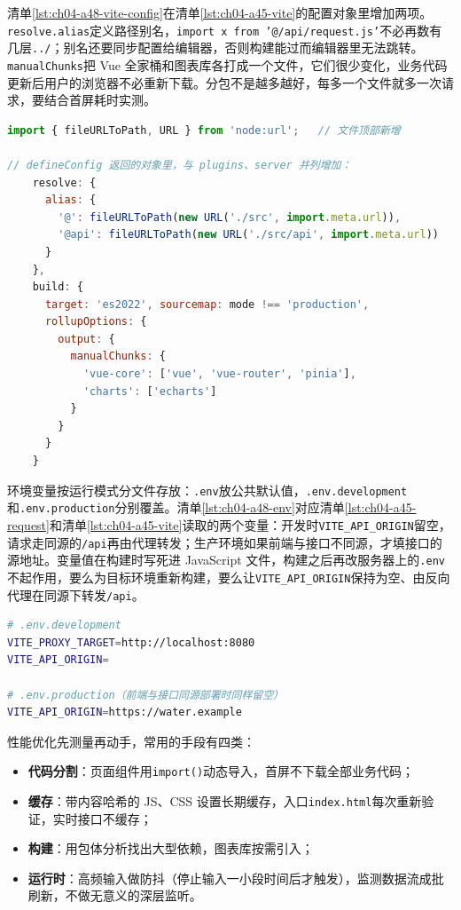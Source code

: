 清单\ref{lst:ch04-a48-vite-config}在清单\ref{lst:ch04-a45-vite}的配置对象里增加两项。\texttt{resolve.alias}定义路径别名，\texttt{import x from '@/api/request.js'}不必再数有几层\texttt{../}；别名还要同步配置给编辑器，否则构建能过而编辑器里无法跳转。\texttt{manualChunks}把 Vue 全家桶和图表库各打成一个文件，它们很少变化，业务代码更新后用户的浏览器不必重新下载。分包不是越多越好，每多一个文件就多一次请求，要结合首屏耗时实测。

\begin{lstlisting}[label={lst:ch04-a48-vite-config},language=JavaScript,caption={vite.config.js 的新增部分：路径别名与 manualChunks 分包}]
import { fileURLToPath, URL } from 'node:url';   // 文件顶部新增

// defineConfig 返回的对象里，与 plugins、server 并列增加：
    resolve: {
      alias: {
        '@': fileURLToPath(new URL('./src', import.meta.url)),
        '@api': fileURLToPath(new URL('./src/api', import.meta.url))
      }
    },
    build: {
      target: 'es2022', sourcemap: mode !== 'production',
      rollupOptions: {
        output: {
          manualChunks: {
            'vue-core': ['vue', 'vue-router', 'pinia'],
            'charts': ['echarts']
          }
        }
      }
    }
\end{lstlisting}

环境变量按运行模式分文件存放：\texttt{.env}放公共默认值，\texttt{.env.development}和\texttt{.env.production}分别覆盖。清单\ref{lst:ch04-a48-env}对应清单\ref{lst:ch04-a45-request}和清单\ref{lst:ch04-a45-vite}读取的两个变量：开发时\texttt{VITE\_API\_ORIGIN}留空，请求走同源的\texttt{/api}再由代理转发；生产环境如果前端与接口不同源，才填接口的源地址。变量值在构建时写死进 JavaScript 文件，构建之后再改服务器上的\texttt{.env}不起作用，要么为目标环境重新构建，要么让\texttt{VITE\_API\_ORIGIN}保持为空、由反向代理在同源下转发\texttt{/api}。

\begin{lstlisting}[label={lst:ch04-a48-env},language=bash,caption={按模式区分的 Vite 环境变量文件}]
# .env.development
VITE_PROXY_TARGET=http://localhost:8080
VITE_API_ORIGIN=

# .env.production（前端与接口同源部署时同样留空）
VITE_API_ORIGIN=https://water.example
\end{lstlisting}

性能优化先测量再动手，常用的手段有四类：
\begin{itemize}
\item \textbf{代码分割}：页面组件用\texttt{import()}动态导入，首屏不下载全部业务代码；
\item \textbf{缓存}：带内容哈希的 JS、CSS 设置长期缓存，入口\texttt{index.html}每次重新验证，实时接口不缓存；
\item \textbf{构建}：用包体分析找出大型依赖，图表库按需引入；
\item \textbf{运行时}：高频输入做防抖（停止输入一小段时间后才触发），监测数据流成批刷新，不做无意义的深层监听。
\end{itemize}

